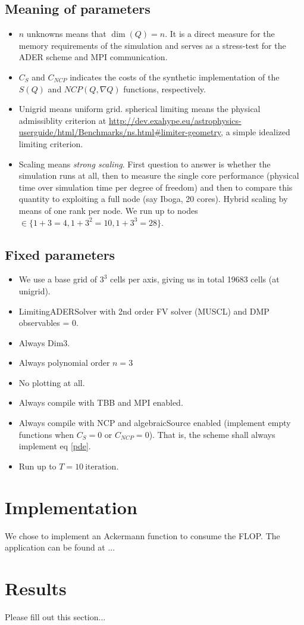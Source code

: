 \documentclass{article}
\begin{document}
\subsection{Meaning of parameters}
\begin{itemize}
\item $n$ unknowns means that $\dim(Q)=n$. It is a direct measure
for the memory requirements of the simulation and serves as a
stress-test for the ADER scheme and MPI communication.

\item $C_S$ and $C_{NCP}$ indicates the costs of the synthetic
implementation of the $S(Q)$ and $NCP(Q,\nabla Q)$ functions,
respectively.

\item Unigrid means uniform grid. spherical limiting means the
physical admissiblity criterion at
\url{http://dev.exahype.eu/astrophysics-userguide/html/Benchmarks/ns.html#limiter-geometry},
a simple idealized limiting criterion.

\item Scaling means \emph{strong scaling}. First question to answer
is whether the simulation runs at all, then to measure the single
core performance (physical time over simulation time per degree
of freedom) and then to compare this quantity to exploiting a
full node (say Iboga, 20 cores). Hybrid scaling by means of one
rank per node. We run up to nodes
$\in \{ 1+3 = 4, 1+3^2 = 10, 1+3^3 = 28 \}$.
\end{itemize}

\subsection{Fixed parameters}
\begin{itemize}
\item  We use a base grid of $3^3$ cells per axis, giving us in total 19683 cells (at unigrid).
\item  LimitingADERSolver with 2nd order FV solver (MUSCL) and DMP observables = 0.
\item  Always Dim3.
\item  Always polynomial order $n=3$
\item  No plotting at all.
\item  Always compile with TBB and MPI enabled.
\item  Always compile with NCP and algebraicSource enabled
(implement empty functions when $C_S=0$ or $C_{NCP}=0$). That is,
the scheme shall always implement eq \eqref{pde}.
\item  Run up to $T = 10 ~\text{iteration}$.
\end{itemize}

\section{Implementation}
We chose to implement an Ackermann function to consume the FLOP.
The application can be found at ...

\section{Results}
Please fill out this section...
\end{document}
